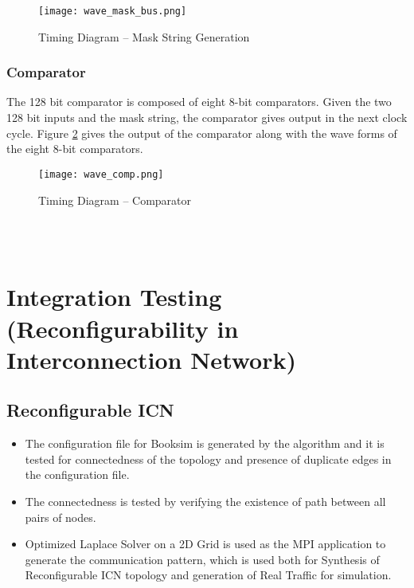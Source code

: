     \begin{figure}[!ht]

	    
	    \centering
	    \texttt{[image: wave\_mask\_bus.png]}
	    \caption{ Timing Diagram -- Mask String Generation}
	    \label{fig:wave_mask}
    \end{figure}

\subsubsection{Comparator}
    The 128 bit comparator is composed of eight 8-bit comparators. Given the two 128 bit inputs and the mask string, the comparator gives output in the next clock cycle. Figure \ref{fig:wave_comp} gives the output of the comparator along with the wave forms of the eight 8-bit comparators.

    \begin{figure}[!ht]

	    
	    \centering
	    \texttt{[image: wave\_comp.png]}
	    \caption{ Timing Diagram -- Comparator}
	    \label{fig:wave_comp}
    \end{figure}

\ \\ \\
\section{Integration Testing (Reconfigurability in Interconnection Network)}

\subsection{Reconfigurable ICN }
\begin{itemize}
  \item The configuration file for Booksim is generated by the algorithm and it is tested for connectedness of the topology and presence of duplicate edges in the configuration file.

\item The connectedness is tested by verifying the existence of path between all pairs of nodes.

\item Optimized Laplace Solver on a 2D Grid \cite{laplace} is used as the MPI application to generate the communication pattern, which is used both for Synthesis of Reconfigurable ICN topology and generation of Real Traffic for simulation.

\end{itemize}

